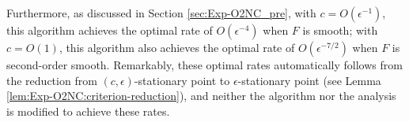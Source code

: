 Furthermore, as discussed in Section \ref{sec:Exp-O2NC_pre}, with $c=O(\epsilon^{-1})$, this algorithm achieves the optimal rate of $O(\epsilon^{-4})$ when $F$ is smooth; with $c=O(1)$, this algorithm also achieves the optimal rate of $O(\epsilon^{-7/2})$ when $F$ is second-order smooth. Remarkably, these optimal rates automatically follows from the reduction from $(c,\epsilon)$-stationary point to $\epsilon$-stationary point (see Lemma \ref{lem:Exp-O2NC:criterion-reduction}), and neither the algorithm nor the analysis is modified to achieve these rates.

